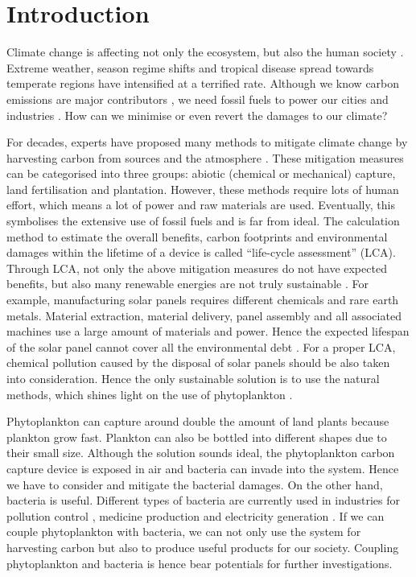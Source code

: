 \documentclass[../thesis.tex]{subfiles} %
\begin{document}
\section{Introduction}

Climate change is affecting not only the ecosystem, but also the human society \autocite{notz2016observed,schuur2015climate}.  Extreme weather, season regime shifts and tropical disease spread towards temperate regions have intensified at a terrified rate.  Although we know carbon emissions are major contributors \autocite{notz2016observed}, we need fossil fuels to power our cities and industries \autocite{ferguson2000electricity}.  How can we minimise or even revert the damages to our climate?

For decades, experts have proposed many methods to mitigate climate change by harvesting carbon from sources and the atmosphere \autocite{farrelly2013carbon,yang2008progress}.  These mitigation measures can be categorised into three groups: abiotic (chemical or mechanical) capture, land fertilisation and plantation.  However, these methods require lots of human effort, which means a lot of power and raw materials are used.  Eventually, this symbolises the extensive use of fossil fuels and is far from ideal.  The calculation method to estimate the overall benefits, carbon footprints and environmental damages within the lifetime of a device is called ``life-cycle assessment” (LCA).  Through LCA, not only the above mitigation measures do not have expected benefits, but also many renewable energies are not truly sustainable \autocite{abdussalam2020green}.  For example, manufacturing solar panels requires different chemicals and rare earth metals.  Material extraction, material delivery, panel assembly and all associated machines use a large amount of materials and power.  Hence the expected lifespan of the solar panel cannot cover all the environmental debt \autocite{martinopoulos2020rooftop}.  For a proper LCA, chemical pollution caused by the disposal of solar panels should be also taken into consideration.  Hence the only sustainable solution is to use the natural methods, which shines light on the use of phytoplankton \autocite{farrelly2013carbon}.

Phytoplankton can capture around double the amount of land plants \autocite{SCHLESINGER2013341} because plankton grow fast.  Plankton can also be bottled into different shapes \autocite{evanson_2019} due to their small size.  Although the solution sounds ideal, the phytoplankton carbon capture device is exposed in air and bacteria can invade into the system.  Hence we have to consider and mitigate the bacterial damages.  On the other hand, bacteria is useful.  Different types of bacteria are currently used in industries for pollution control \autocite{dash2013marine,naik2013lead}, medicine production \autocite{huang2012industrial} and electricity generation \autocite{songera2012electricity}.  If we can couple phytoplankton with bacteria, we can not only use the system for harvesting carbon but also to produce useful products for our society.  Coupling phytoplankton and bacteria is hence bear potentials for further investigations.
\end{document}
